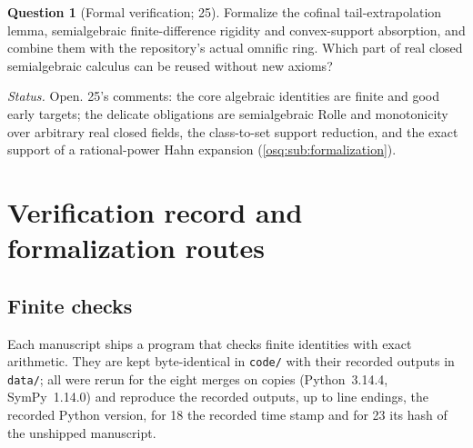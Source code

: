 \documentclass[11pt,letterpaper]{article}
\numberwithin{equation}{section}
\theoremstyle{definition}
\newtheorem{question}[question]{Question}
\theoremstyle{remark}
\theoremstyle{plain}
\begin{document}
\begin{question}[Formal verification; 25]\label{osq:sa:q:formal}
Formalize the cofinal tail-extrapolation lemma, semialgebraic finite-difference rigidity and convex-support absorption, and combine them with the
repository's actual omnific ring. Which part of real closed semialgebraic calculus can be reused without new axioms?
\end{question}
\emph{Status.} Open. 25's comments: the core algebraic identities are finite and good early targets; the delicate obligations are semialgebraic Rolle and
monotonicity over arbitrary real closed fields, the class-to-set support reduction, and the exact support of a rational-power Hahn expansion
(\cref{osq:sub:formalization}).

\section{Verification record and formalization routes}\label{osq:sec:provenance}

\subsection{Finite checks}\label{osq:sub:checks}
Each manuscript ships a program that checks finite identities with exact arithmetic. They are
kept byte-identical in \texttt{code/} with their recorded outputs in \texttt{data/}; all were rerun
for the eight merges on copies (Python~3.14.4, SymPy~1.14.0) and reproduce the recorded outputs, up to line
endings, the recorded Python version, for 18 the recorded time stamp and for 23 its hash of the unshipped manuscript.
\end{document}
